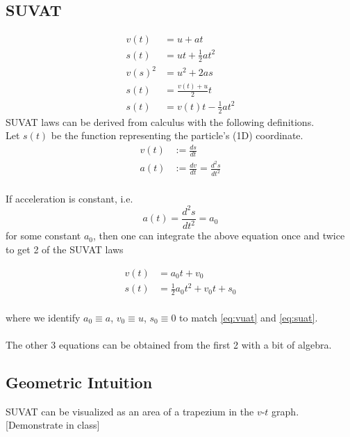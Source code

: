 \documentclass{article}
\begin{document}
\subsection{SUVAT}
\begin{align}
v(t)&=u+a t \label{eq:vuat} \\
s(t)&=u t+\frac{1}{2} a t^2 \label{eq:suat}\\
 v(s)^2&=u^2+2 a s \label{eq:vuas} \\
 s(t)&=\frac{v(t)+u}{2} t \label{eq:svut}\\
 s(t)&=v(t) t-\frac{1}{2} a t^2 \label{eq:svat}
\end{align}
SUVAT laws can be derived from calculus with the following definitions.\\[10pt]
Let $s(t)$ be the function representing the particle's (1D) coordinate.
\begin{align}
    v(t) &:= \frac{ds}{dt} \\
    a(t) &:= \frac{dv}{dt} = \frac{d^2 s}{dt^2}
\end{align}
\\
If acceleration is constant, i.e. $$a(t) = \frac{d^2 s}{dt^2} = a_0$$ for some constant $a_0$, then one can integrate the above equation once and twice to get 2 of the SUVAT laws 

\begin{align}
    v(t) &= a_0 t + v_0 \\
    s(t) &= \frac{1}{2} a_0 t^2 + v_0 t + s_0 
\end{align}
\\
where we identify $a_0 \equiv a$, $v_0 \equiv u$, $s_0 \equiv 0$ to match \ref{eq:vuat} and \ref{eq:suat}.\\
\\
The other 3 equations can be obtained from the first 2 with a bit of algebra.\\

\subsection{Geometric Intuition}
SUVAT can be visualized as an area of a trapezium in the $v\text{-}t$ graph. [Demonstrate in class]
\end{document}

